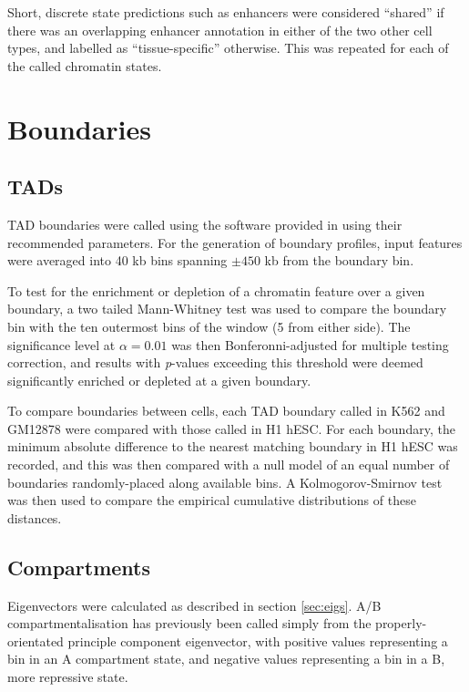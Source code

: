 \documentclass[a4paper,10pt,oneside]{book}
\begin{document}
Short, discrete state predictions such as enhancers were
considered ``shared'' if there was an overlapping enhancer annotation in
either of the two other cell types, and labelled as ``tissue-specific''
otherwise. This was repeated for each of the called chromatin states.

\section{Boundaries}\label{boundaries}

\subsection{TADs}\label{tads}

TAD boundaries were called using the software provided in
\citet{Dixon2012} using their recommended parameters. For the generation
of boundary profiles, input features were
averaged into 40 kb bins spanning $\pm450$ kb from the boundary bin.

To test for the enrichment or depletion of a chromatin feature over a
given boundary, a two tailed Mann-Whitney test was used to compare the
boundary bin with the ten outermost bins of the window (5 from either
side). The significance level at $\alpha = 0.01$ was then
Bonferonni-adjusted for multiple testing correction, and results with
\emph{p}-values exceeding this threshold were deemed significantly
enriched or depleted at a given boundary.

To compare boundaries between cells, each TAD boundary called in K562 and GM12878 were compared with those called in H1 hESC. For each boundary, the minimum absolute difference to the nearest matching boundary in H1 hESC was recorded, and this was then compared with a null model of an equal number of boundaries randomly-placed along available bins. A Kolmogorov-Smirnov test was then used to compare the empirical cumulative distributions of these distances.

\subsection{Compartments}\label{sec:compartments}

Eigenvectors were calculated as described in section \ref{sec:eigs}. A/B compartmentalisation has previously been called simply from the properly-orientated principle component eigenvector, with positive values representing a bin in an A compartment state, and negative values representing a bin in a B, more repressive state.\cite{Lieberman2009} 
\end{document}
